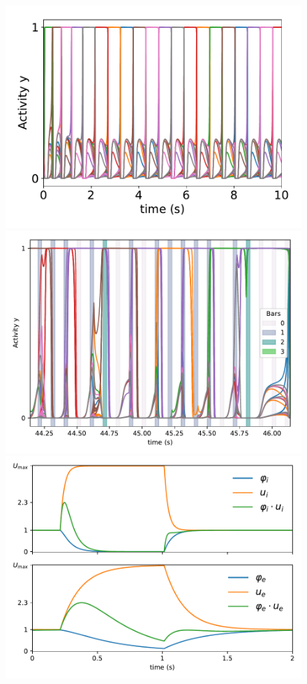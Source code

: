 \documentclass[10pt,a4paper]{article}
\begin{document}
		
		\begin{figure}
			\centering
			\includegraphics[width=0.8\linewidth]{./double_activity}
			\includegraphics[width=0.8\linewidth]{./double_activity_legend}
			\includegraphics[width=0.8\linewidth]{./double_depletion}
		\end{figure}
				
\end{document}
